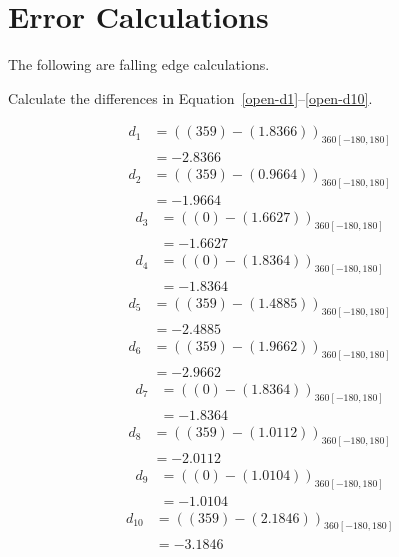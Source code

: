 \documentclass[twocolumn]{article}
\begin{document}
\section{Error Calculations}

The following are falling edge calculations.

Calculate the differences in Equation~\ref{open-d1}--\ref{open-d10}.

\begin{align}
d_{1} &= ((359) - (1.8366))_{360[-180,180]} \nonumber\\
 &= -2.8366 \label{open-d1}
\end{align}
\begin{align}
d_{2} &= ((359) - (0.9664))_{360[-180,180]} \nonumber\\
 &= -1.9664 \label{open-d2}
\end{align}
\begin{align}
d_{3} &= ((0) - (1.6627))_{360[-180,180]} \nonumber\\
 &= -1.6627 \label{open-d3}
\end{align}
\begin{align}
d_{4} &= ((0) - (1.8364))_{360[-180,180]} \nonumber\\
 &= -1.8364 \label{open-d4}
\end{align}
\begin{align}
d_{5} &= ((359) - (1.4885))_{360[-180,180]} \nonumber\\
 &= -2.4885 \label{open-d5}
\end{align}
\begin{align}
d_{6} &= ((359) - (1.9662))_{360[-180,180]} \nonumber\\
 &= -2.9662 \label{open-d6}
\end{align}
\begin{align}
d_{7} &= ((0) - (1.8364))_{360[-180,180]} \nonumber\\
 &= -1.8364 \label{open-d7}
\end{align}
\begin{align}
d_{8} &= ((359) - (1.0112))_{360[-180,180]} \nonumber\\
 &= -2.0112 \label{open-d8}
\end{align}
\begin{align}
d_{9} &= ((0) - (1.0104))_{360[-180,180]} \nonumber\\
 &= -1.0104 \label{open-d9}
\end{align}
\begin{align}
d_{10} &= ((359) - (2.1846))_{360[-180,180]} \nonumber\\
 &= -3.1846 \label{open-d10}
\end{align}
\end{document}
